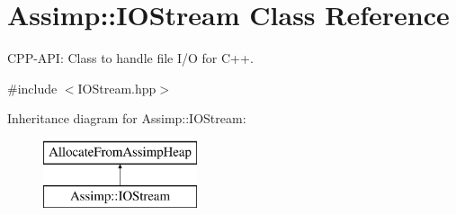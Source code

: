 \hypertarget{class_assimp_1_1_i_o_stream}{\section{Assimp\-:\-:I\-O\-Stream Class Reference}
\label{class_assimp_1_1_i_o_stream}
}


C\-P\-P-\/\-A\-P\-I\-: Class to handle file I/\-O for C++.  




{\ttfamily \#include $<$I\-O\-Stream.\-hpp$>$}

Inheritance diagram for Assimp\-:\-:I\-O\-Stream\-:\begin{figure}[H]
\begin{center}
\leavevmode
\includegraphics[height=2.000000cm]{class_assimp_1_1_i_o_stream}
\end{center}
\end{figure}
